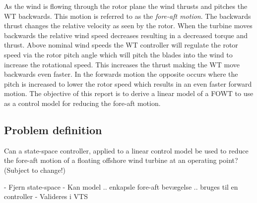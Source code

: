 \medskip
As the wind is flowing through the rotor plane the wind thrusts and pitches the WT backwards. This motion is referred to as the \textit{fore-aft motion}. The backwards thrust changes the relative velocity as seen by the rotor. When the turbine moves backwards the relative wind speed decreases resulting in a decreased torque and thrust. Above nominal wind speeds the WT controller will regulate the rotor speed via the rotor pitch angle which will pitch the blades into the wind to increase the rotational speed. This increases the thrust making the WT move backwards even faster. In the forwards motion the opposite occurs where the pitch is increased to lower the rotor speed which results in an even faster forward motion. The objective of this report is to derive a linear model of a FOWT to use as a control model for reducing the fore-aft motion. 



\subsection{Problem definition} \label{sec:intro_problemdef}
Can a state-space controller, applied to a linear control model be used to reduce the fore-aft motion of a floating offshore wind turbine at an operating point? (Subject to change!)

- Fjern state-space
- Kan model .. enkapsle fore-aft bevægelse .. bruges til en controller
- Valideres i VTS

